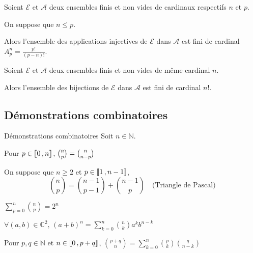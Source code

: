     \begin{prop}{}{}
        Soient $\mathcal{E}$ et $\mathcal{A}$ deux ensembles finis et non vides de cardinaux respectifs $n$ et $p$.

        On suppose que $n \leq p$.

        Alors l’ensemble des applications injectives de $\mathcal{E}$ dans $\mathcal{A}$ est fini de cardinal $A_p^n = \frac{p!}{(p-n)!}$.
    \end{prop}

    \begin{coro}{}{}
        Soient $\mathcal{E}$ et $\mathcal{A}$ deux ensembles finis et non vides de même cardinal $n$.

        Alors l’ensemble des bijections de $\mathcal{E}$ dans $\mathcal{A}$ est fini de cardinal $n!$.
    \end{coro}

    \subsection{Démonstrations combinatoires}

    \begin{prop}{Démonstrations combinatoires}{}
        Soit $n \in \mathbb{N}$.

        \begin{alors}
            \item Pour $p \in \left\llbracket 0 \, , n \right\rrbracket, \, \binom{n}{p} = \binom{n}{n-p}$
            \item On suppose que $n \geq 2$ et $p \in \left\llbracket 1 \, , n-1 \right\rrbracket$, \[ \binom{n}{p} = \binom{n-1}{p-1} + \binom{n-1}{p} \quad \text{(Triangle de Pascal)} \]
            \item $\sum\limits_{p=0}^n \binom{n}{p} = 2^n$
            \item $\forall (a,b) \in \mathbb{C}^2, \, (a+b)^n = \sum\limits_{k=0}^n \binom{n}{k} a^k b^{n-k}$
            \item Pour $p,q \in \mathbb{N}$ et $n \in \left\llbracket 0 \, , p+q \right\rrbracket$, $\binom{p+q}{n} = \sum\limits_{k=0}^n \binom{p}{k} \binom{q}{n-k}$
        \end{alors}
    \end{prop}

